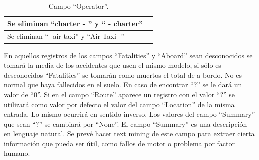 \documentclass[a4paper,10pt]{article}
\begin{document}
\begin{table}[htbp]
\centering
\begin{tabular}{p{2cm} p{10cm}}
\hline \hline
Se eliminan ``charter - '' y `` - charter''&\\
\hline
Se eliminan ``- air taxi'' y ``Air Taxi -''&\\
\hline \hline

\end{tabular}
\caption{Campo ``Operator''.}
\label{tabla:autores}
\end{table}

\pagebreak
En aquellos registros de los campos ``Fatalities'' y ``Aboard'' sean desconocidos se tomar\'a la media de los accidentes que usen el mismo modelo, si s\'olo es desconocidos ``Fatalities'' se tomar\'an como muertos el total de a bordo.
    \singlespacing
No es normal que haya fallecidos en el suelo. En caso de encontrar ``?'' se le dar\'a un valor de ``0''.
    \singlespacing
Si en el campo ``Route'' aparece un registro con el valor ``?'' se utilizar\'a como valor por defecto el valor del campo ``Location'' de la misma entrada. Lo mismo ocurrir\'a en sentido inverso.
\singlespacing
	Los valores del campo ``Summary'' que sean ``?'' se cambiar\'a por ``None''. El campo ``Summary'' es una descripci\'on en lenguaje natural. Se prev\'e hacer text mining de este campo para extraer cierta informaci\'on que pueda ser \'util, como fallos de motor o problema por factor humano.
\end{document}

